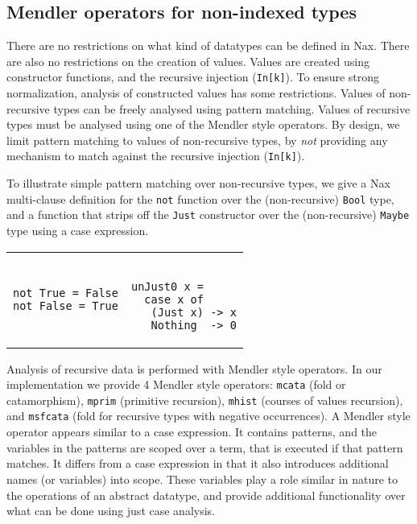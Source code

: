 \subsection{Mendler operators for non-indexed types}
There are no restrictions on what kind of datatypes
can be defined in Nax. There are also no restrictions on the creation
of values. Values are created using constructor functions, and the recursive injection (\verb+In[k]+). 
To ensure strong normalization, analysis of constructed
values has some restrictions. Values of non-recursive types can
be freely analysed using pattern matching. Values of recursive types
must be analysed using one of the Mendler style operators. By design,
we limit pattern matching to values of non-recursive types, by
{\em not} providing any mechanism to match against
the recursive injection (\verb+In[k]+).

To illustrate simple pattern matching over non-recursive types, we 
give a Nax multi-clause definition 
for the \verb+not+ function over the (non-recursive) \verb+Bool+ type,
and a function that strips off the \verb+Just+ constructor over the (non-recursive) \verb+Maybe+ type
using a case expression.

\begin{tabular}{l|l}
\begin{minipage}[l]{.42\linewidth}
{\small
\begin{verbatim}
not True = False
not False = True
\end{verbatim}}
\end{minipage}

& 

\begin{minipage}[l]{.50\linewidth}
{\small
\begin{verbatim}

unJust0 x = 
  case x of
   (Just x) -> x
   Nothing  -> 0
\end{verbatim}}
\end{minipage}
\end{tabular}
\vspace*{.1in}

Analysis of recursive data is performed with Mendler style operators. In our
implementation we provide 4 Mendler style operators: \verb+mcata+ (fold or catamorphism),
\verb+mprim+ (primitive recursion), \verb+mhist+ (courses of values recursion), and
\verb+msfcata+ (fold for recursive types with negative occurrences). A Mendler style
operator appears similar to a case expression. It contains patterns, and the variables in
the patterns are scoped over a term, that is executed if that pattern matches. It differs
from a case expression in that it also introduces additional names (or variables) into
scope. These variables play a role similar in nature to the operations of an abstract
datatype, and provide additional functionality over what can be done using just
case analysis.

